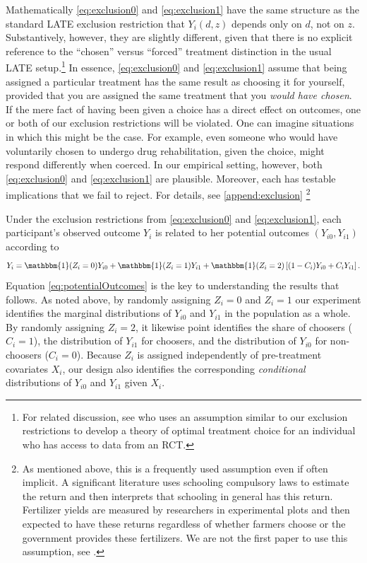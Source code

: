 \documentclass[11pt, a4paper]{article}
\begin{document}
Mathematically \eqref{eq:exclusion0} and \eqref{eq:exclusion1} have the same structure as the standard LATE exclusion restriction that $Y_i(d,z)$ depends only on $d$, not on $z$. 
Substantively, however, they are slightly different, given that there is no explicit reference to the ``chosen'' versus ``forced'' treatment distinction in the usual LATE setup.\footnote{For related discussion, see \cite{chamberlain2011bayesian} who uses an assumption similar to our exclusion restrictions to develop a theory of optimal treatment choice for an individual who has access to data from an RCT.} 
In essence, \eqref{eq:exclusion0} and \eqref{eq:exclusion1} assume that being assigned a particular treatment has the same result as choosing it for yourself, provided that you are assigned the same treatment that you \emph{would have chosen}. 
If the mere fact of having been given a choice has a direct effect on outcomes, one or both of our exclusion restrictions will be violated.
One can imagine situations in which this might be the case.
For example, even someone who would have voluntarily chosen to undergo drug rehabilitation, given the choice, might respond differently when coerced.
In our empirical setting, however, both \eqref{eq:exclusion0} and \eqref{eq:exclusion1} are plausible. 
Moreover, each has testable implications that we fail to reject.
For details, see \ref{append:exclusion} \footnote{As mentioned above, this is a frequently used assumption even if often implicit. A significant literature uses schooling compulsory laws to estimate the return and then interprets that schooling in general has this return. Fertilizer yields are measured by researchers in experimental plots and then expected to have these returns regardless of whether farmers choose or the government provides these fertilizers. We are not the first paper to use this assumption, see \cite{chamberlain2011bayesian}.}


Under the exclusion restrictions from \eqref{eq:exclusion0} and \eqref{eq:exclusion1}, each participant's observed outcome $Y_i$ is related to her potential outcomes $(Y_{i0}, Y_{i1})$ according to  
\begin{equation}
    Y_i = \mathbbm{1}(Z_i =0) Y_{i0} + \mathbbm{1}(Z_i = 1)  Y_{i1}  + \mathbbm{1}(Z_i = 2) \left[(1 - C_i) Y_{i0} + C_i Y_{i1} \right].
\label{eq:potentialOutcomes}
\end{equation}
Equation \ref{eq:potentialOutcomes} is the key to understanding the results that follows. 
As noted above, by randomly assigning $Z_i=0$ and $Z_i = 1$ our experiment identifies the marginal distributions of $Y_{i0}$ and $Y_{i1}$ in the population as a whole. 
By randomly assigning $Z_i=2$, it likewise point identifies the share of choosers ($C_i = 1$), the distribution of $Y_{i1}$ for choosers, and the distribution of $Y_{i0}$ for non-choosers ($C_i = 0$).
Because $Z_i$ is assigned independently of pre-treatment covariates $X_i$, our design also identifies the corresponding \emph{conditional} distributions of $Y_{i0}$ and $Y_{i1}$ given $X_i$. 
\end{document}
